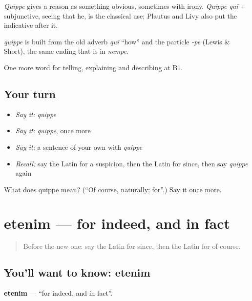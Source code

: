 \emph{Quippe} gives a reason as something obvious, sometimes with irony. \emph{Quippe quī} + subjunctive, seeing that he, is the classical use; Plautus and Livy also put the indicative after it.

\begin{cousinweb}
\emph{quippe} is built from the old adverb \emph{quī} \textquotedblleft{}how\textquotedblright{} and the particle \emph{-pe} (Lewis \& Short), the same ending that is in \emph{nempe}.
\end{cousinweb}

\begin{grammarlens}[title={What you've built}]
One more word for telling, explaining and describing at B1.
\end{grammarlens}

\subsection*{Your turn}
\begin{itemize}
\raggedright
  \item \emph{Say it:} \emph{quippe}
  \item \emph{Say it:} \emph{quippe}, once more
  \item \emph{Say it:} a sentence of your own with \emph{quippe}
  \item \emph{Recall:} say the Latin for a suspicion, then the Latin for since, then say \emph{quippe} again
\end{itemize}

\begin{tcolorbox}[breakable,colback=teal!4,colframe=teal!35!black,title={Before you move on}]
What does quippe mean? (\textquotedblleft{}Of course, naturally; for\textquotedblright{}.) Say it once more.
\end{tcolorbox}
\section[etenim]{etenim — for indeed, and in fact}

\label{lesson:LA-C365-etenim}



\begin{quote}
Before the new one: say the Latin for since, then the Latin for of course.
\end{quote}

\subsection*{You'll want to know: etenim}
\textbf{etenim} — \textquotedblleft{}for indeed, and in fact\textquotedblright{}.

